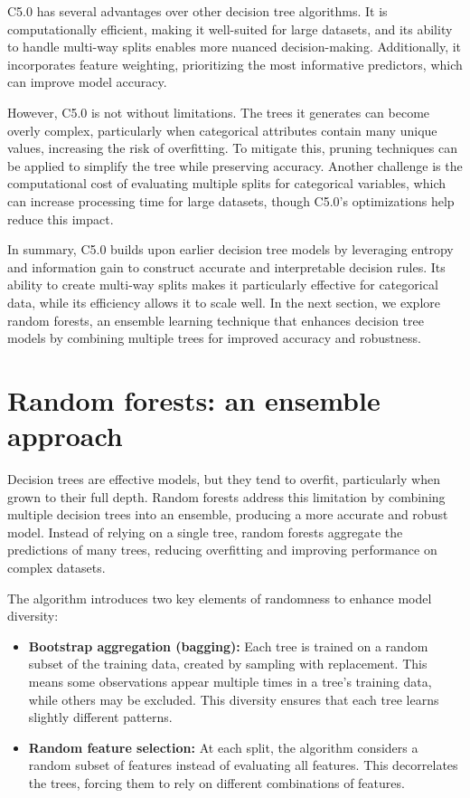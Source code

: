 \documentclass[
  11pt,
]{book}
\providecommand{\tightlist}{%
  \setlength{\itemsep}{0pt}\setlength{\parskip}{0pt}}
\theoremstyle{definition}
\theoremstyle{definition}
\theoremstyle{definition}
\theoremstyle{definition}
\theoremstyle{remark}
\begin{document}
C5.0 has several advantages over other decision tree algorithms. It is computationally efficient, making it well-suited for large datasets, and its ability to handle multi-way splits enables more nuanced decision-making. Additionally, it incorporates feature weighting, prioritizing the most informative predictors, which can improve model accuracy.

However, C5.0 is not without limitations. The trees it generates can become overly complex, particularly when categorical attributes contain many unique values, increasing the risk of overfitting. To mitigate this, pruning techniques can be applied to simplify the tree while preserving accuracy. Another challenge is the computational cost of evaluating multiple splits for categorical variables, which can increase processing time for large datasets, though C5.0's optimizations help reduce this impact.

In summary, C5.0 builds upon earlier decision tree models by leveraging entropy and information gain to construct accurate and interpretable decision rules. Its ability to create multi-way splits makes it particularly effective for categorical data, while its efficiency allows it to scale well. In the next section, we explore random forests, an ensemble learning technique that enhances decision tree models by combining multiple trees for improved accuracy and robustness.

\section{Random forests: an ensemble approach}\label{random-forests-an-ensemble-approach}

Decision trees are effective models, but they tend to overfit, particularly when grown to their full depth. Random forests address this limitation by combining multiple decision trees into an ensemble, producing a more accurate and robust model. Instead of relying on a single tree, random forests aggregate the predictions of many trees, reducing overfitting and improving performance on complex datasets.

The algorithm introduces two key elements of randomness to enhance model diversity:

\begin{itemize}
\tightlist
\item
  \textbf{Bootstrap aggregation (bagging):} Each tree is trained on a random subset of the training data, created by sampling with replacement. This means some observations appear multiple times in a tree's training data, while others may be excluded. This diversity ensures that each tree learns slightly different patterns.\\
\item
  \textbf{Random feature selection:} At each split, the algorithm considers a random subset of features instead of evaluating all features. This decorrelates the trees, forcing them to rely on different combinations of features.
\end{itemize}
\end{document}
